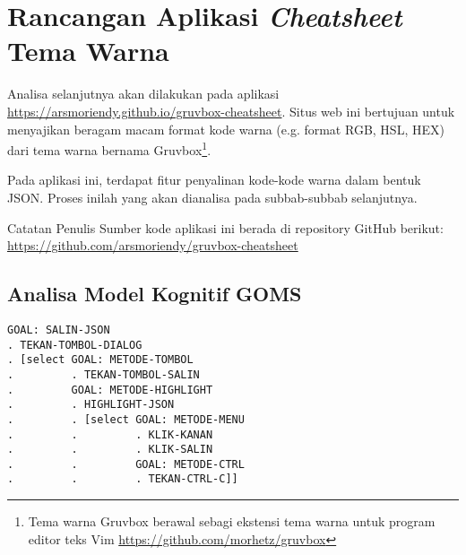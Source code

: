 \section{Rancangan Aplikasi \textit{Cheatsheet} Tema Warna}

Analisa selanjutnya akan dilakukan pada aplikasi
\url{https://arsmoriendy.github.io/gruvbox-cheatsheet}. Situs web
ini bertujuan untuk menyajikan beragam macam format kode warna (e.g.
format RGB, HSL, HEX) dari tema warna bernama Gruvbox\footnote{
  Tema warna Gruvbox berawal sebagi ekstensi tema warna untuk
  program editor teks Vim \url{https://github.com/morhetz/gruvbox}
}.


Pada aplikasi ini, terdapat fitur penyalinan kode-kode warna dalam
bentuk JSON. Proses inilah yang akan dianalisa pada subbab-subbab selanjutnya.

\begin{info}{Catatan Penulis}
  Sumber kode aplikasi ini berada di repository GitHub berikut:
  \url{https://github.com/arsmoriendy/gruvbox-cheatsheet}
\end{info}

\clearpage
\subsection{Analisa Model Kognitif GOMS}

\begin{verbatim}
GOAL: SALIN-JSON
. TEKAN-TOMBOL-DIALOG
. [select GOAL: METODE-TOMBOL
.         . TEKAN-TOMBOL-SALIN
.         GOAL: METODE-HIGHLIGHT
.         . HIGHLIGHT-JSON
.         . [select GOAL: METODE-MENU
.         .         . KLIK-KANAN
.         .         . KLIK-SALIN
.         .         GOAL: METODE-CTRL
.         .         . TEKAN-CTRL-C]]
\end{verbatim}

